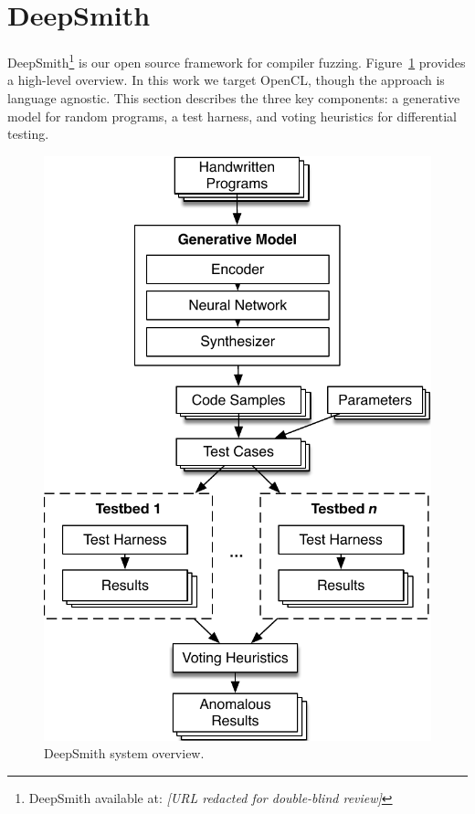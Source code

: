 \section{DeepSmith}

DeepSmith\footnote{DeepSmith available at: \emph{[URL redacted for double-blind review]}} is our open source framework for compiler fuzzing. Figure~\ref{fig:deeptune} provides a high-level overview. In this work we target OpenCL, though the approach is language agnostic. This section describes the three key components: a generative model for random programs, a test harness, and voting heuristics for differential testing.

\begin{figure}
  \centering
  \includegraphics[width=\columnwidth]{img/deepsmith} %
  \caption{%
    DeepSmith system overview.
    \vspace{-1.1em}
  }%
  \label{fig:deeptune}
\end{figure}

